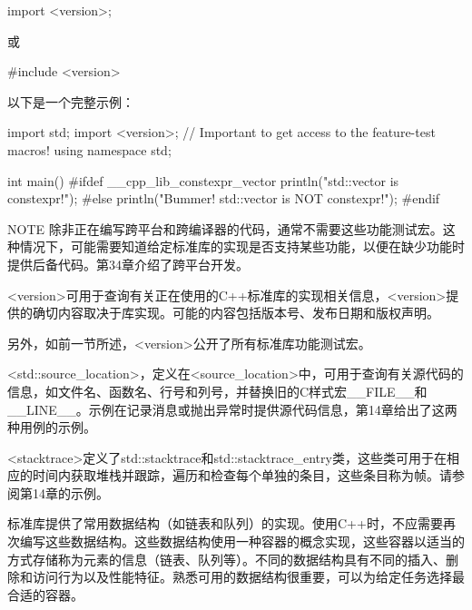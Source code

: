 \begin{cpp}
import <version>;
\end{cpp}

或

\begin{cpp}
#include <version>
\end{cpp}

以下是一个完整示例：

\begin{cpp}
import std;
import <version>; // Important to get access to the feature-test macros!
using namespace std;

int main()
{
#ifdef __cpp_lib_constexpr_vector
    println("std::vector is constexpr!");
#else
    println("Bummer! std::vector is NOT constexpr!");
#endif
}
\end{cpp}

\begin{myNotic}{NOTE}
除非正在编写跨平台和跨编译器的代码，通常不需要这些功能测试宏。这种情况下，可能需要知道给定标准库的实现是否支持某些功能，以便在缺少功能时提供后备代码。第34章介绍了跨平台开发。
\end{myNotic}


<version>可用于查询有关正在使用的C++标准库的实现相关信息，<version>提供的确切内容取决于库实现。可能的内容包括版本号、发布日期和版权声明。

另外，如前一节所述，<version>公开了所有标准库功能测试宏。


<std::source\_location>，定义在<source\_location>中，可用于查询有关源代码的信息，如文件名、函数名、行号和列号，并替换旧的C样式宏\_\_FILE\_\_和\_\_LINE\_\_。示例在记录消息或抛出异常时提供源代码信息，第14章给出了这两种用例的示例。



<stacktrace>定义了std::stacktrace和std::stacktrace\_entry类，这些类可用于在相应的时间内获取堆栈并跟踪，遍历和检查每个单独的条目，这些条目称为帧。请参阅第14章的示例。


标准库提供了常用数据结构（如链表和队列）的实现。使用C++时，不应需要再次编写这些数据结构。这些数据结构使用一种容器的概念实现，这些容器以适当的方式存储称为元素的信息（链表、队列等）。不同的数据结构具有不同的插入、删除和访问行为以及性能特征。熟悉可用的数据结构很重要，可以为给定任务选择最合适的容器。

